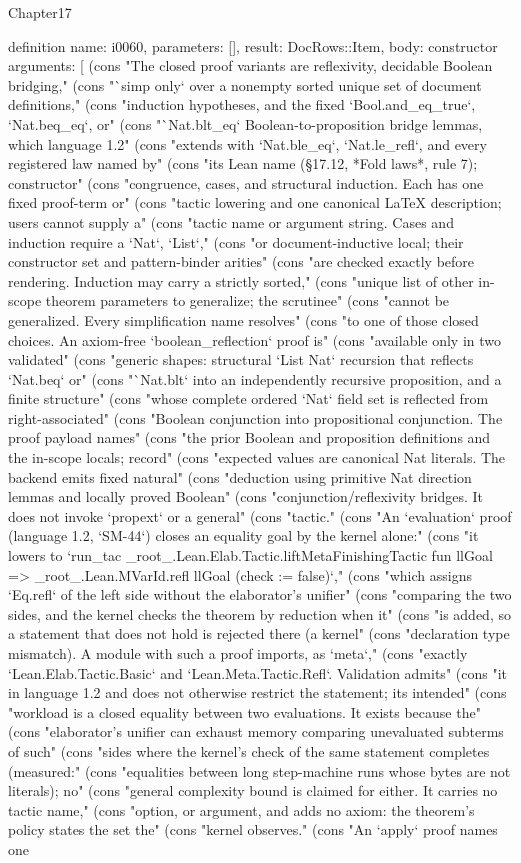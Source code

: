 \begin{lexlean}{Chapter17}
\begin{semanticmodule}
definition{
  name: i0060,
  parameters: [],
  result: DocRows::Item,
  body: constructor{
    arguments: [
      (cons "The closed proof variants are reflexivity, decidable Boolean bridging," (cons "`simp only` over a nonempty sorted unique set of document definitions," (cons "induction hypotheses, and the fixed `Bool.and_eq_true`, `Nat.beq_eq`, or" (cons "`Nat.blt_eq` Boolean-to-proposition bridge lemmas, which language 1.2" (cons "extends with `Nat.ble_eq`, `Nat.le_refl`, and every registered law named by" (cons "its Lean name (§17.12, *Fold laws*, rule 7); constructor" (cons "congruence, cases, and structural induction. Each has one fixed proof-term or" (cons "tactic lowering and one canonical LaTeX description; users cannot supply a" (cons "tactic name or argument string. Cases and induction require a `Nat`, `List`," (cons "or document-inductive local; their constructor set and pattern-binder arities" (cons "are checked exactly before rendering. Induction may carry a strictly sorted," (cons "unique list of other in-scope theorem parameters to generalize; the scrutinee" (cons "cannot be generalized. Every simplification name resolves" (cons "to one of those closed choices. An axiom-free `boolean_reflection` proof is" (cons "available only in two validated" (cons "generic shapes: structural `List Nat` recursion that reflects `Nat.beq` or" (cons "`Nat.blt` into an independently recursive proposition, and a finite structure" (cons "whose complete ordered `Nat` field set is reflected from right-associated" (cons "Boolean conjunction into propositional conjunction. The proof payload names" (cons "the prior Boolean and proposition definitions and the in-scope locals; record" (cons "expected values are canonical Nat literals. The backend emits fixed natural" (cons "deduction using primitive Nat direction lemmas and locally proved Boolean" (cons "conjunction/reflexivity bridges. It does not invoke `propext` or a general" (cons "tactic." (cons "An `evaluation` proof (language 1.2, `SM-44`) closes an equality goal by the kernel alone:" (cons "it lowers to `run_tac _root_.Lean.Elab.Tactic.liftMetaFinishingTactic fun llGoal => _root_.Lean.MVarId.refl llGoal (check := false)`," (cons "which assigns `Eq.refl` of the left side without the elaborator's unifier" (cons "comparing the two sides, and the kernel checks the theorem by reduction when it" (cons "is added, so a statement that does not hold is rejected there (a kernel" (cons "declaration type mismatch). A module with such a proof imports, as `meta`," (cons "exactly `Lean.Elab.Tactic.Basic` and `Lean.Meta.Tactic.Refl`. Validation admits" (cons "it in language 1.2 and does not otherwise restrict the statement; its intended" (cons "workload is a closed equality between two evaluations. It exists because the" (cons "elaborator's unifier can exhaust memory comparing unevaluated subterms of such" (cons "sides where the kernel's check of the same statement completes (measured:" (cons "equalities between long step-machine runs whose bytes are not literals); no" (cons "general complexity bound is claimed for either. It carries no tactic name," (cons "option, or argument, and adds no axiom: the theorem's policy states the set the" (cons "kernel observes." (cons "An `apply` proof names one }}
\end{semanticmodule}
\end{lexlean}
